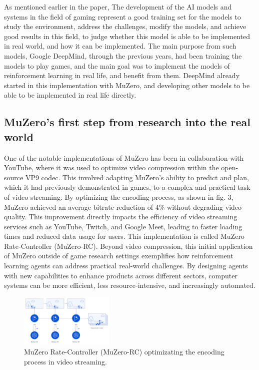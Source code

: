 As mentioned earlier in the paper, The development of the AI models and systems
in the field of gaming represent a good training set for the models to study
the environment, address the challenges, modify the models, and achieve good
results in this field, to judge whether this model is able to be implemented in
real world, and how it can be implemented. The main purpose from such models,
Google DeepMind, through the previous years, had been training the models to
play games, and the main goal was to implement the models of reinforcement
learning in real life, and benefit from them. DeepMind already started in this
implementation with MuZero, and developing other models to be able to be
implemented in real life directly.
\subsection*{MuZero's first step from research into the real world}
One of the notable implementations of MuZero has been in collaboration with
YouTube, where it was used to optimize video compression within the open-source
VP9 codec. This involved adapting MuZero's ability to predict and plan, which
it had previously demonstrated in games, to a complex and practical task of
video streaming. By optimizing the encoding process, as shown in fig. 3, MuZero
achieved an average bitrate reduction of 4\% without degrading video
quality\cite{FD1}. This improvement directly impacts the efficiency of video
streaming services such as YouTube, Twitch, and Google Meet, leading to faster
loading times and reduced data usage for users. This implementation is called
MuZero Rate-Controller (MuZero-RC). Beyond video compression, this initial
application of MuZero outside of game research settings exemplifies how
reinforcement learning agents can address practical real-world challenges. By
designing agents with new capabilities to enhance products across different
sectors, computer systems can be more efficient, less resource-intensive, and
increasingly automated\cite{FD1}.
\begin{figure}[h]
    \centering
    \includegraphics[width=0.4\textwidth]{sections/8Future Directions/MuZeroRC.jpg}

    \caption{MuZero Rate-Controller (MuZero-RC) optimizating the encoding process in video streaming.}
\end{figure}
